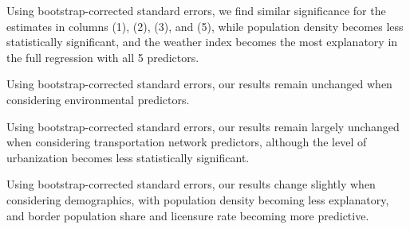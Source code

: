 \begin{table}[H]
	\begin{center}
		
		\label{main_estimates_w_boot}
		\caption[Bootstrap-Corrected Main Predictor Estimates, Weighted]{Using bootstrap-corrected standard errors, we find similar significance for the estimates in columns (1), (2), (3), and (5), while population density becomes less statistically significant, and the weather index becomes the most explanatory in the full regression with all 5 predictors.}
	\end{center}
\end{table}

\begin{table}[H]
	\begin{center}
		
		\label{environmental_estimates_w_boot}
		\caption[Bootstrap-Corrected Environmental Predictor Estimates, Weighted]{Using bootstrap-corrected standard errors, our results remain unchanged when considering environmental predictors.}
	\end{center}
\end{table}

\begin{table}[H]
	\begin{center}
		
		\label{transportation_estimates_w_boot}
		\caption[Bootstrap-Corrected Transportation Infrastructure Predictor Estimates, Weighted]{Using bootstrap-corrected standard errors, our results remain largely unchanged when considering transportation network predictors, although the level of urbanization becomes less statistically significant.}
	\end{center}
\end{table}

\begin{table}[H]
	\begin{center}
		
		\label{demographic_estimates_w_boot}
		\caption[Bootstrap-Corrected Demographic Predictor Estimates, Weighted]{Using bootstrap-corrected standard errors, our results change slightly when considering demographics, with population density becoming less explanatory, and border population share and licensure rate becoming more predictive.}
	\end{center}
\end{table}

